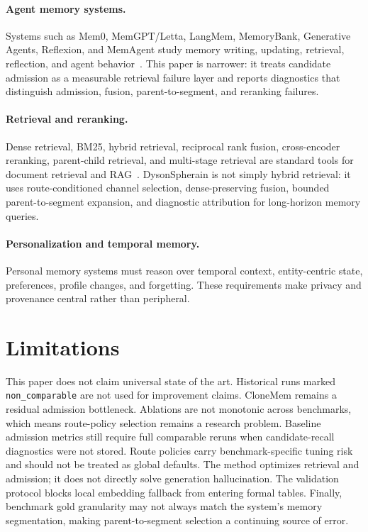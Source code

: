 \documentclass[10pt]{article}
\newcommand{\system}{DysonSpherain}
\begin{document}
\paragraph{Agent memory systems.}
Systems such as Mem0, MemGPT/Letta, LangMem, MemoryBank, Generative Agents,
Reflexion, and MemAgent study memory writing, updating, retrieval, reflection,
and agent behavior~\cite{mem02024,packer2023memgpt,langmem2025,zhong2023memorybank,park2023generativeagents,shinn2023reflexion}.
This paper is narrower: it treats candidate admission as a measurable
retrieval failure layer and reports diagnostics that distinguish admission,
fusion, parent-to-segment, and reranking failures.

\paragraph{Retrieval and reranking.}
Dense retrieval, BM25, hybrid retrieval, reciprocal rank fusion, cross-encoder
reranking, parent-child retrieval, and multi-stage retrieval are standard tools
for document retrieval and RAG~\cite{robertson2009probabilistic,karpukhin2020dense,cormack2009rrf,nogueira2019passage,lewis2020rag}.
\system{} is not simply hybrid retrieval: it uses route-conditioned channel
selection, dense-preserving fusion, bounded parent-to-segment expansion, and
diagnostic attribution for long-horizon memory queries.

\paragraph{Personalization and temporal memory.}
Personal memory systems must reason over temporal context, entity-centric
state, preferences, profile changes, and forgetting. These requirements make
privacy and provenance central rather than peripheral.

\section{Limitations}

This paper does not claim universal state of the art. Historical runs marked
\texttt{non\_comparable} are not used for improvement claims. CloneMem remains
a residual admission bottleneck. Ablations are not monotonic across benchmarks,
which means route-policy selection remains a research problem. Baseline
admission metrics still require full comparable reruns when candidate-recall
diagnostics were not stored. Route policies carry benchmark-specific tuning
risk and should not be treated as global defaults. The method optimizes
retrieval and admission; it does not directly solve generation hallucination.
The validation protocol blocks local embedding fallback from entering formal
tables. Finally, benchmark gold granularity may not always match the system's
memory segmentation, making parent-to-segment selection a continuing source of
error.
\end{document}
